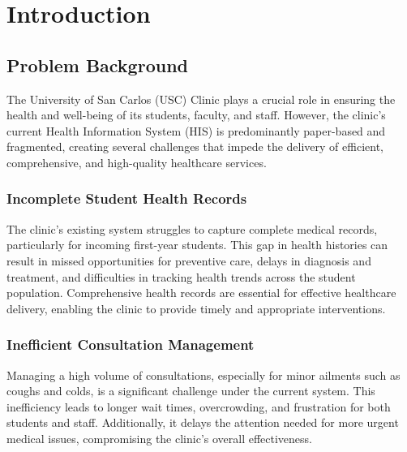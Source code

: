 
\chapter{Introduction}  %

\ifpdf
    \graphicspath{{Chapter1/Figs/Raster/}{Chapter1/Figs/PDF/}{Chapter1/Figs/}}
\else
    \graphicspath{{Chapter1/Figs/Vector/}{Chapter1/Figs/}}
\fi

\section{Problem Background}

The University of San Carlos (USC) Clinic plays a crucial role in ensuring the health and well-being of its students, faculty, and staff. However, the clinic's current Health Information System (HIS) is predominantly paper-based and fragmented, creating several challenges that impede the delivery of efficient, comprehensive, and high-quality healthcare services.

\subsection{Incomplete Student Health Records}
The clinic's existing system struggles to capture complete medical records, particularly for incoming first-year students. This gap in health histories can result in missed opportunities for preventive care, delays in diagnosis and treatment, and difficulties in tracking health trends across the student population. Comprehensive health records are essential for effective healthcare delivery, enabling the clinic to provide timely and appropriate interventions.

\subsection{Inefficient Consultation Management}
Managing a high volume of consultations, especially for minor ailments such as coughs and colds, is a significant challenge under the current system. This inefficiency leads to longer wait times, overcrowding, and frustration for both students and staff. Additionally, it delays the attention needed for more urgent medical issues, compromising the clinic's overall effectiveness.

